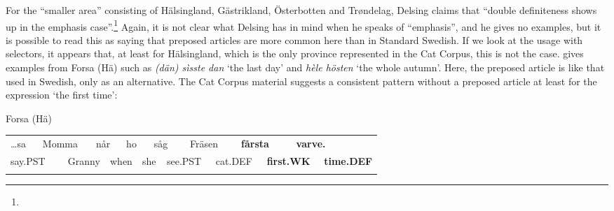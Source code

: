 \begin{styleBodyTextFirst}
For the “smaller area” consisting of Hälsingland, Gästrikland, Österbotten and Trøndelag, Delsing claims that “double definiteness shows up in the emphasis case”.\footnote{} Again, it is not clear what Delsing has in mind when he speaks of “emphasis”, and he gives no examples, but it is possible to read this as saying that preposed articles are more common here than in Standard Swedish. If we look at the usage with selectors, it appears that, at least for Hälsingland, which is the only province represented in the Cat Corpus, this is not the case. \citet[31]{Franck1995} gives examples from Forsa (Hä) such as \textit{(dän) sìsste dan} ‘the last day’ and \textit{hèle hösten} ‘the whole autumn’.  Here, the preposed article is like that used in Swedish, only as an alternative. The Cat Corpus material suggests a consistent pattern without a preposed article at least for the expression ‘the first time’:

\end{styleBodyTextFirst}

\begin{listWWNumileveli}
\item 

\end{listWWNumileveli}

\begin{listWWNumlxxileveli}
\item 

\begin{styleExLtrTbl}
Forsa (Hä)

\end{styleExLtrTbl}

\end{listWWNumlxxileveli}

\begin{tabular}{llllllllllllllll}
\lsptoprule
…sa & \multicolumn{2}{l}{Momma

} & \multicolumn{2}{l}{når

} & \multicolumn{2}{l}{ho

} & \multicolumn{2}{l}{såg

} & \multicolumn{2}{l}{Fräsen

} & \multicolumn{2}{l}{{\bfseries fårsta}

} & \multicolumn{2}{l}{{\bfseries varve.}

} & \\
\multicolumn{2}{l}{say.PST

} & \multicolumn{2}{l}{Granny

} & \multicolumn{2}{l}{when

} & \multicolumn{2}{l}{she

} & \multicolumn{2}{l}{see.PST

} & \multicolumn{2}{l}{cat.DEF

} & \multicolumn{2}{l}{{\bfseries first.WK}

} & \multicolumn{2}{l}{{\bfseries time.DEF}

}\\
\lspbottomrule
\end{tabular}

